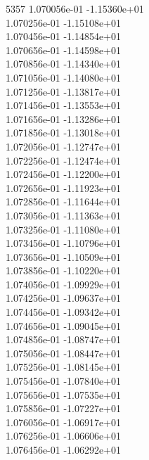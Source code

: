 5357	1.070056e-01	-1.15360e+01	\\ 	1.070256e-01	-1.15108e+01	\\ 	1.070456e-01	-1.14854e+01	\\ 	1.070656e-01	-1.14598e+01	\\ 	1.070856e-01	-1.14340e+01	\\ 	1.071056e-01	-1.14080e+01	\\ 	1.071256e-01	-1.13817e+01	\\ 	1.071456e-01	-1.13553e+01	\\ 	1.071656e-01	-1.13286e+01	\\ 	1.071856e-01	-1.13018e+01	\\ 	1.072056e-01	-1.12747e+01	\\ 	1.072256e-01	-1.12474e+01	\\ 	1.072456e-01	-1.12200e+01	\\ 	1.072656e-01	-1.11923e+01	\\ 	1.072856e-01	-1.11644e+01	\\ 	1.073056e-01	-1.11363e+01	\\ 	1.073256e-01	-1.11080e+01	\\ 	1.073456e-01	-1.10796e+01	\\ 	1.073656e-01	-1.10509e+01	\\ 	1.073856e-01	-1.10220e+01	\\ 	1.074056e-01	-1.09929e+01	\\ 	1.074256e-01	-1.09637e+01	\\ 	1.074456e-01	-1.09342e+01	\\ 	1.074656e-01	-1.09045e+01	\\ 	1.074856e-01	-1.08747e+01	\\ 	1.075056e-01	-1.08447e+01	\\ 	1.075256e-01	-1.08145e+01	\\ 	1.075456e-01	-1.07840e+01	\\ 	1.075656e-01	-1.07535e+01	\\ 	1.075856e-01	-1.07227e+01	\\ 	1.076056e-01	-1.06917e+01	\\ 	1.076256e-01	-1.06606e+01	\\ 	1.076456e-01	-1.06292e+01	\\ \hline
